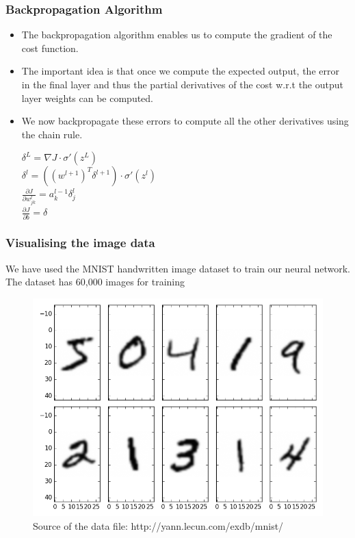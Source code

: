 \documentclass{beamer}
\begin{document}

\begin{frame}
\frametitle{Backpropagation Algorithm}
\begin{itemize}
\item The backpropagation algorithm enables us to compute the gradient of the cost function.
\item The important idea is that once we compute the expected output, the error in the final layer and thus the partial derivatives of the cost w.r.t the output layer weights can be computed.
\item We now backpropagate these errors to compute all the other derivatives using the chain rule.\\
\begin{center}
$\delta^L = \nabla J \cdot \sigma'(z^L)$\\
$\delta^l = ((w^{l+1})^T \delta^{l+1}) \cdot \sigma'(z^l)$\\
$\frac{\partial J}{\partial w^l_{jk}} = a^{l-1}_k \delta^l_j$\\
$\frac{\partial J}{\partial b} = \delta$
\end{center}

\end{itemize}
\end{frame}


\begin{frame}
\frametitle{Visualising the image data}
We have used the MNIST handwritten image dataset to train our neural network. The dataset has 60,000 images for training
\begin{figure}
\includegraphics[width=0.8\linewidth]{numbers}
\caption{Source of the data file: http://yann.lecun.com/exdb/mnist/}
\end{figure}
\end{frame}
\end{document}
